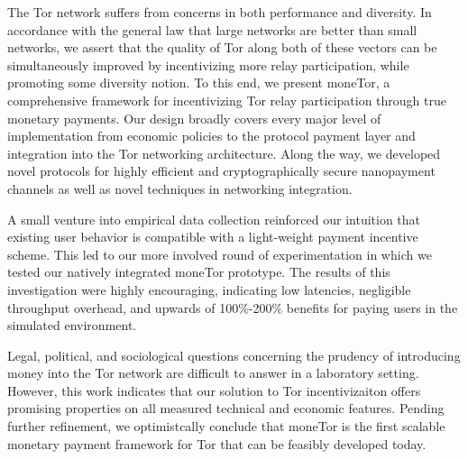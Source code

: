 The Tor network suffers from concerns in both performance and diversity. In
accordance with the general law that large networks are better than small
networks, we assert that the quality of Tor along both of these vectors can be
simultaneously improved by incentivizing more relay participation, while
promoting some diversity notion. To this end, we present moneTor, a
comprehensive framework for incentivizing Tor relay participation through true
monetary payments. Our design broadly covers every major level of implementation
from economic policies to the protocol payment layer and integration into the
Tor networking architecture. Along the way, we developed novel protocols for
highly efficient and cryptographically secure nanopayment channels as well as
novel techniques in networking integration.

A small venture into empirical data collection reinforced our intuition that
existing user behavior is compatible with a light-weight payment incentive
scheme. This led to our more involved round of experimentation in which we
tested our natively integrated moneTor prototype. The results of this
investigation were highly encouraging, indicating low latencies, negligible
throughput overhead, and upwards of 100\%-200\% benefits for paying users in the
simulated environment.

Legal, political, and sociological questions concerning the prudency of
introducing money into the Tor network are difficult to answer in a laboratory
setting. However, this work indicates that our solution to Tor incentivizaiton
offers promising properties on all measured technical and economic
features. Pending further refinement, we optimistcally conclude that moneTor is
the first scalable monetary payment framework for Tor that can be feasibly
developed today.